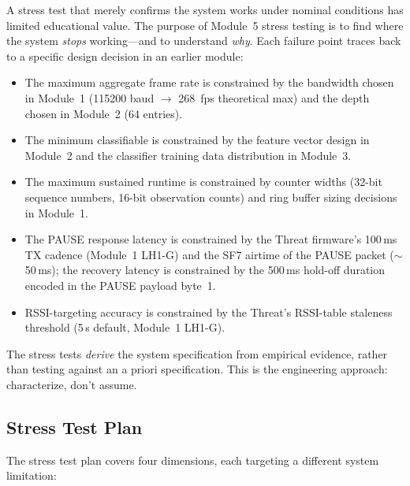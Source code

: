 \documentclass[11pt,letterpaper]{article}
\begin{document}
	\begin{tcolorbox}[infobox={Design Principle: Finding the Specification---Not Proving Compliance}]
		A stress test that merely confirms the system works under nominal conditions has limited educational value. The purpose of Module~5 stress testing is to find where the system \emph{stops} working---and to understand \emph{why}. Each failure point traces back to a specific design decision in an earlier module:
		\begin{itemize}
			\item The maximum aggregate frame rate is constrained by the \UART{} bandwidth chosen in Module~1 (115200 baud $\rightarrow$ 268~fps theoretical max) and the \FIFO{} depth chosen in Module~2 (64 entries).
			\item The minimum classifiable \SNR{} is constrained by the feature vector design in Module~2 and the classifier training data distribution in Module~3.
			\item The maximum sustained runtime is constrained by counter widths (32-bit sequence numbers, 16-bit observation counts) and ring buffer sizing decisions in Module~1.
			\item The PAUSE response latency is constrained by the Threat firmware's 100\,ms TX cadence (Module~1 LH1-G) and the SF7 airtime of the PAUSE packet ($\sim$50\,ms); the recovery latency is constrained by the 500\,ms hold-off duration encoded in the PAUSE payload byte~1.
			\item RSSI-targeting accuracy is constrained by the Threat's RSSI-table staleness threshold (5\,s default, Module~1 LH1-G).
		\end{itemize}
		The stress tests \emph{derive} the system specification from empirical evidence, rather than testing against an a priori specification. This is the engineering approach: characterize, don't assume.
	\end{tcolorbox}

	\subsection{Stress Test Plan}

	The stress test plan covers four dimensions, each targeting a different system limitation:
\end{document}
